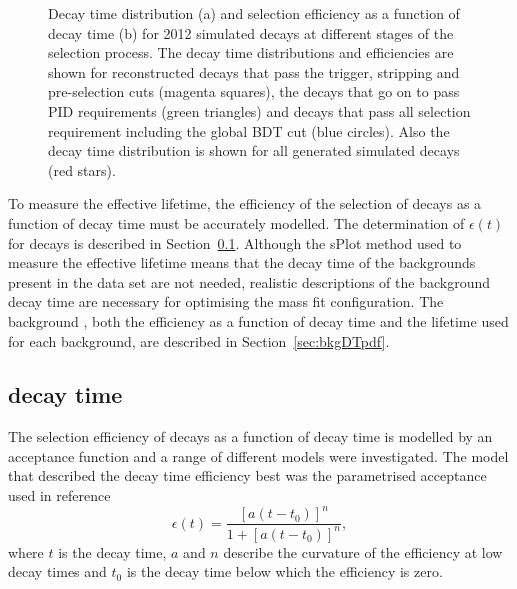 \begin{figure}[tbp]
\begin{subfigure}[b]{0.48\textwidth}
   \end{subfigure}
    \caption{Decay time distribution (a) and selection efficiency as a function of decay time (b) for 2012 \bsmumu simulated decays at different stages of the selection process. The decay time distributions and efficiencies are shown for reconstructed decays that pass the trigger, stripping and pre-selection cuts (magenta squares), the decays that go on to pass PID requirements (green triangles) and decays that pass all selection requirement including the global BDT cut (blue circles). Also the decay time distribution is shown for all generated simulated decays (red stars).} %
    \label{fig:accpteg}
\end{figure}

To measure the \bsmumu effective lifetime, the efficiency of the selection of \bsmumu decays as a function of decay time must be accurately modelled. The determination of $\epsilon(t)$ for \bsmumu decays is described in Section~\ref{sec:signalDTpdf}. Although the sPlot method used to measure the \bsmumu effective lifetime means that the decay time \pdfs of the backgrounds present in the data set are not needed, realistic  descriptions of the background decay time \pdfs are necessary for optimising the mass fit configuration. The background \pdfs, both the efficiency as a function of decay time and the lifetime used for each background, are described in Section~\ref{sec:bkgDTpdf}.


\subsection[\bsmumu decay time \pdf]{\boldmath{\bsmumu} decay time \pdf}%
\label{sec:signalDTpdf}
The selection efficiency of \bsmumu decays as a function of decay time is modelled by an acceptance function and a range of different models were investigated. The model that described the \bsmumu decay time efficiency best was the parametrised acceptance used in reference~\cite{LHCb:2011ab} 
\begin{equation}
\epsilon(t) = \frac{[a(t - t_{0})]^{n}}{1 + [a(t - t_{0})]^{n}},
\label{eq:accpt}
\end{equation}
where $t$ is the decay time, $a$ and $n$ describe the curvature of the efficiency at low decay times and $t_0$ is the decay time below which the efficiency is zero. 


